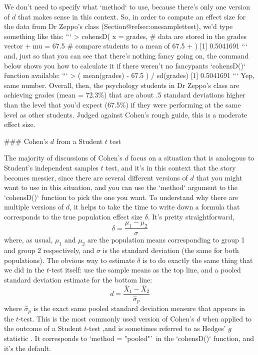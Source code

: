 We don't need to specify what `method` to use, because there's only one version of $d$ that makes sense in this context. So, in order to compute an effect size for the data from Dr Zeppo's class (Section@refsec:onesamplettest), we'd type something like this:
```
> cohensD( x = grades,    # data are stored in the grades vector
+          mu = 67.5      # compare students to a mean of 67.5
+ )
[1] 0.5041691
```
and, just so that you can see that there's nothing fancy going on, the command below shows you how to calculate it if there weren't no fancypants `cohensD()` function available:
```
> ( mean(grades) - 67.5 ) / sd(grades)
[1] 0.5041691
```
Yep, same number. Overall, then, the psychology students in Dr Zeppo's class are achieving grades (mean = 72.3\%) that are about .5 standard deviations higher than the level that you'd expect (67.5\%) if they were performing at the same level as other students. Judged against Cohen's rough guide, this is a moderate effect size.


### Cohen's $d$ from a Student $t$ test

The majority of discussions of Cohen's $d$ focus on a situation that is analogous to Student's independent samples $t$ test, and it's in this context that the story becomes messier, since there are several different versions of $d$ that you might want to use in this situation, and you can use the `method` argument to the `cohensD()` function to pick the one you want. To understand why there are multiple versions of $d$, it helps to take the time to write down a formula that corresponds to the true population effect size $\delta$. It's pretty straightforward, 
$$
\delta = \frac{\mu_1 - \mu_2}{\sigma}
$$
where, as usual, $\mu_1$ and $\mu_2$ are the population means corresponding to group 1 and group 2 respectively, and $\sigma$ is the standard deviation (the same for both populations). The obvious way to estimate $\delta$ is to do exactly the same thing that we did in the $t$-test itself: use the sample means as the top line, and a pooled standard deviation estimate for the bottom line:
$$
d = \frac{\bar{X}_1 - \bar{X}_2}{\hat{\sigma}_p}
$$
where $\hat\sigma_p$ is the exact same pooled standard deviation measure that appears in the $t$-test. This is the most commonly used version of Cohen's $d$ when applied to the outcome of a Student $t$-test ,and is sometimes referred to as Hedges' $g$ statistic \cite{Hedges1981}. It corresponds to `method = "pooled"` in the `cohensD()` function, and it's the default. 

